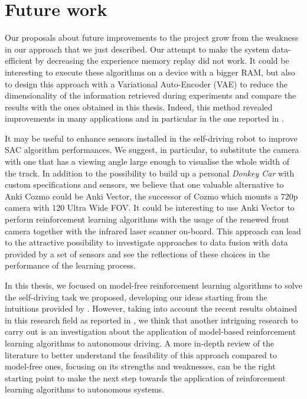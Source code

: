 \section{Future work}

Our proposals about future improvements to the project grow from the weakness in our approach that we just described.
Our attempt to make the system data-efficient by decreasing the experience memory replay did not work.
It could be interesting to execute these algorithms on a device with a bigger RAM, but also to design this approach with a Variational Auto-Encoder (VAE) \cite{kingma2013auto} to reduce the dimensionality of the information retrieved during experiments and compare the results with the ones obtained in this thesis.
Indeed, this method revealed improvements in many applications and in particular in the one reported in \cite{kendall2018learning,kendall2019learning}.

It may be useful to enhance sensors installed in the self-driving robot to improve SAC algorithm performances.
We suggest, in particular, to substitute the camera with one that has a viewing angle large enough to visualise the whole width of the track.
In addition to the possibility to build up a personal \textit{Donkey Car} with custom specifications and sensors, we believe that one valuable alternative to Anki Cozmo could be Anki Vector, the successor of Cozmo which mounts a 720p camera with 120 Ultra Wide FOV.
It could be interesting to use Anki Vector to perform reinforcement learning algorithms with the usage of the renewed front camera together with the infrared laser scanner on-board. This approach can lead to the attractive possibility to investigate approaches to data fusion with data provided by a set of sensors and see the reflections of these choices in the performance of the learning process.

In this thesis, we focused on model-free reinforcement learning algorithms to solve the self-driving task we proposed, developing our ideas starting from the intuitions provided by \cite{kendall2018learning,kendall2019learning}.
However, taking into account the recent results obtained in this research field as reported in \cite{hawke2019urban,wayve2019learned}, we think that another intriguing research to carry out is an investigation about the application of model-based reinforcement learning algorithms to autonomous driving.
A more in-depth review of the literature to better understand the feasibility of this approach compared to model-free ones, focusing on its strengths and weaknesses, can be the right starting point to make the next step towards the application of reinforcement learning algorithms to autonomous systems.